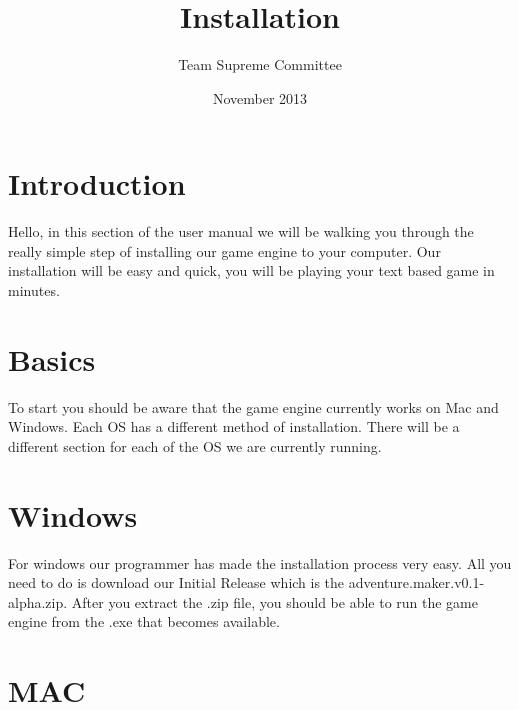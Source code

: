 \documentclass[11pt]{article}
\begin{document}
\title{Installation}
\author{Team Supreme Committee}
\date{November 2013}
\maketitle


\section{Introduction}

Hello, in this section of the user manual we will be walking you through the really simple step of installing our game engine to your computer. Our installation will be easy and quick, you will be playing your text based game in minutes.

\section{Basics}

To start you should be aware that the game engine currently works on Mac and Windows. Each OS has a different method of installation. There will be a different section for each of the OS we are currently running.

\section{Windows}

For windows our programmer has made the installation process very easy. All you need to do is download our Initial Release which is the adventure.maker.v0.1-alpha.zip. After you extract the .zip file, you should be able to run the game engine from the .exe that becomes available.

\section{MAC}
\end{document}
